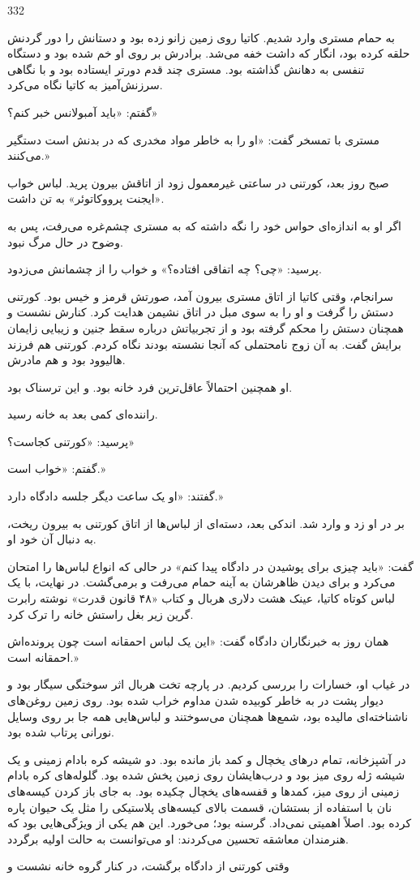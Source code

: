 332

به حمام مستری وارد شدیم. کاتیا روی زمین زانو زده بود و دستانش را دور گردنش حلقه کرده بود، انگار که داشت خفه می‌شد. برادرش بر روی او خم شده بود و دستگاه تنفسی به دهانش گذاشته بود. مستری چند قدم دورتر ایستاده بود و با نگاهی سرزنش‌آمیز به کاتیا نگاه می‌کرد.

گفتم: «باید آمبولانس خبر کنم؟»

مستری با تمسخر گفت: «او را به خاطر مواد مخدری که در بدنش است دستگیر می‌کنند.»

صبح روز بعد، کورتنی در ساعتی غیرمعمول زود از اتاقش بیرون پرید. لباس خواب «ایجنت پرووکاتوئر» به تن داشت.

اگر او به اندازه‌ای حواس خود را نگه داشته که به مستری چشم‌غره می‌رفت، پس به وضوح در حال مرگ نبود.

پرسید: «چی؟ چه اتفاقی افتاده؟» و خواب را از چشمانش می‌زدود.

سرانجام، وقتی کاتیا از اتاق مستری بیرون آمد، صورتش قرمز و خیس بود. کورتنی دستش را گرفت و او را به سوی مبل در اتاق نشیمن هدایت کرد. کنارش نشست و همچنان دستش را محکم گرفته بود و از تجربیاتش درباره سقط جنین و زیبایی زایمان برایش گفت. به آن زوج نامحتملی که آنجا نشسته بودند نگاه کردم. کورتنی هم فرزند هالیوود بود و هم مادرش.

او همچنین احتمالاً عاقل‌ترین فرد خانه بود. و این ترسناک بود.

راننده‌ای کمی بعد به خانه رسید.

پرسید: «کورتنی کجاست؟»

گفتم: «خواب است.»

گفتند: «او یک ساعت دیگر جلسه دادگاه دارد.»

بر در او زد و وارد شد. اندکی بعد، دسته‌ای از لباس‌ها از اتاق کورتنی به بیرون ریخت، به دنبال آن خود او.

گفت: «باید چیزی برای پوشیدن در دادگاه پیدا کنم» در حالی که انواع لباس‌ها را امتحان می‌کرد و برای دیدن ظاهرشان به آینه حمام می‌رفت و برمی‌گشت. در نهایت، با یک لباس کوتاه کاتیا، عینک هشت دلاری هربال و کتاب «۴۸ قانون قدرت» نوشته رابرت گرین زیر بغل راستش خانه را ترک کرد.

همان روز به خبرنگاران دادگاه گفت: «این یک لباس احمقانه است چون پرونده‌اش احمقانه است.»

در غیاب او، خسارات را بررسی کردیم. در پارچه تخت هربال اثر سوختگی سیگار بود و دیوار پشت در به خاطر کوبیده شدن مداوم خراب شده بود. روی زمین روغن‌های ناشناخته‌ای مالیده بود، شمع‌ها همچنان می‌سوختند و لباس‌هایی همه جا بر روی وسایل نورانی پرتاب شده بود.

در آشپزخانه، تمام درهای یخچال و کمد باز مانده بود. دو شیشه کره بادام زمینی و یک شیشه ژله روی میز بود و درب‌هایشان روی زمین پخش شده بود. گلوله‌های کره بادام زمینی از روی میز، کمدها و قفسه‌های یخچال چکیده بود. به جای باز کردن کیسه‌های نان با استفاده از بستشان، قسمت بالای کیسه‌های پلاستیکی را مثل یک حیوان پاره کرده بود. اصلاً اهمیتی نمی‌داد. گرسنه بود؛ می‌خورد. این هم یکی از ویژگی‌هایی بود که هنرمندان معاشقه تحسین می‌کردند: او می‌توانست به حالت اولیه برگردد. 

وقتی کورتنی از دادگاه برگشت، در کنار گروه خانه نشست و